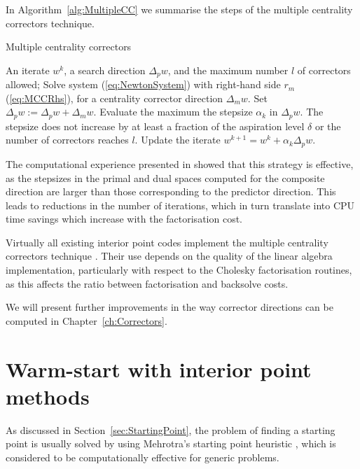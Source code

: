 In Algorithm~\ref{alg:MultipleCC} we summarise the steps of the
multiple centrality correctors technique.
\begin{algorithm}[ht]
  \caption{Multiple centrality correctors}
    \begin{algorithmic}[0]  \label{alg:MultipleCC}
      \REQUIRE An iterate $w^k$, a search direction $\Delta_p w$,
               and the maximum number $l$ of correctors allowed;
        \smallskip
        \REPEAT
           \STATE Solve system (\ref{eq:NewtonSystem}) with right-hand side
                  $r_m$ (\ref{eq:MCCRhs}), for a centrality
                 corrector direction $\Delta_m w$.
           \smallskip
           \STATE Set $\Delta_p w := \Delta_p w + \Delta_m w$.
           \smallskip
	   \STATE Evaluate the maximum the stepsize $\alpha_k$ in $\Delta_p w$.
           \smallskip
        \UNTIL The stepsize does not increase by at least a fraction of
	       the aspiration level $\delta$ or the number of correctors 
               reaches $l$.
        \smallskip
        \STATE Update the iterate $w^{k+1} = w^k + \alpha_k\Delta_p w$.
  \end{algorithmic}
\end{algorithm}

The computational experience presented in \cite{Gondzio96} showed 
that this strategy is effective, as the stepsizes in the primal and 
dual spaces computed for the composite direction are larger than 
those corresponding to the predictor direction. 
This leads to reductions in the number of iterations, which in turn 
translate into CPU time savings which increase with the factorisation
cost.

Virtually all existing interior point codes implement the multiple
centrality correctors technique
\cite[Appendix B]{ipm:Wright97}.
Their use depends on the quality of the linear algebra implementation,
particularly with respect to the Cholesky factorisation routines,
as this affects the ratio between factorisation and backsolve costs.

We will present further improvements in the way corrector directions
can be computed in Chapter~\ref{ch:Correctors}.


%
%
\section{Warm-start with interior point methods}
\label{sec:WarmStart}

As discussed in Section~\ref{sec:StartingPoint}, the problem of 
finding a starting point is usually solved by using 
Mehrotra's starting point heuristic \cite{Mehrotra92}, which is 
considered to be computationally effective for generic problems.

